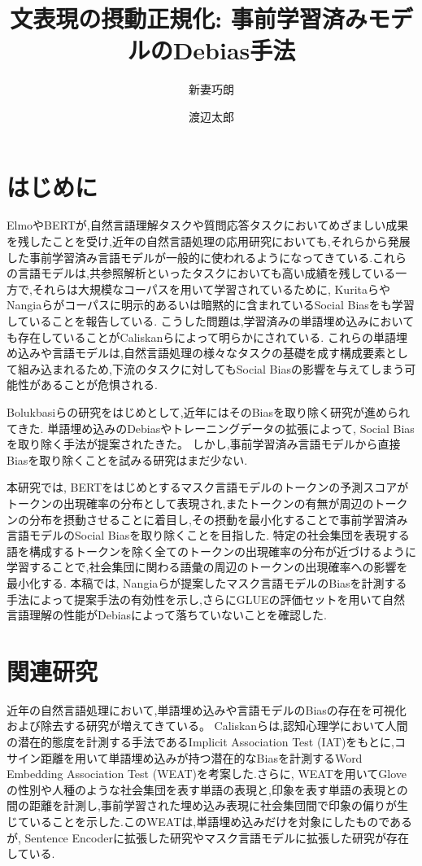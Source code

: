 \documentclass[
  platex, dvipdfmx %
]{nlp2021}
\title{文表現の摂動正規化: 事前学習済みモデルのDebias手法}
\author{新妻巧朗}
\author{渡辺太郎}
\affil{奈良先端科学技術大学院大学 先端科学技術研究科 \\ \texttt{\{niitsuma.takuro.nm3, taro\}@is.naist.jp}}
\begin{document}
\maketitle

\section{はじめに}
Elmo\cite{Peters:2018}やBERT\cite{devlin2018bert}が,自然言語理解タスクや質問応答タスクにおいてめざましい成果を残したことを受け,近年の自然言語処理の応用研究においても,それらから発展した事前学習済み言語モデルが一般的に使われるようになってきている.これらの言語モデルは,共参照解析\cite{joshi2019spanbert}といったタスクにおいても高い成績を残している一方で,それらは大規模なコーパスを用いて学習されているために, Kuritaら\cite{kurita2019measuring}やNangiaら\cite{nangia2020crows}がコーパスに明示的あるいは暗黙的に含まれているSocial Biasをも学習していることを報告している.
こうした問題は,学習済みの単語埋め込みにおいても存在していることがCaliskanら\cite{caliskan2017}によって明らかにされている.
これらの単語埋め込みや言語モデルは,自然言語処理の様々なタスクの基礎を成す構成要素として組み込まれるため,下流のタスクに対してもSocial Biasの影響を与えてしまう可能性があることが危惧される.

Bolukbasiら\cite{bolukbasi2016man}の研究をはじめとして,近年にはそのBiasを取り除く研究が進められてきた.
単語埋め込みのDebiasやトレーニングデータの拡張によって, Social Biasを取り除く手法\cite{kaneko-bollegala-2019-gender, zhao-etal-2018-gender, lucas2018}が提案されたきた。
しかし,事前学習済み言語モデルから直接Biasを取り除くことを試みる研究はまだ少ない.

本研究では, BERTをはじめとするマスク言語モデルのトークンの予測スコアがトークンの出現確率の分布として表現され,またトークンの有無が周辺のトークンの分布を摂動させることに着目し,その摂動を最小化することで事前学習済み言語モデルのSocial Biasを取り除くことを目指した.
特定の社会集団を表現する語を構成するトークンを除く全てのトークンの出現確率の分布が近づけるように学習することで,社会集団に関わる語彙の周辺のトークンの出現確率への影響を最小化する.
本稿では, Nangiaら\cite{nangia2020crows}が提案したマスク言語モデルのBiasを計測する手法によって提案手法の有効性を示し,さらにGLUEの評価セットを用いて自然言語理解の性能がDebiasによって落ちていないことを確認した.

\section{関連研究}
近年の自然言語処理において,単語埋め込みや言語モデルのBiasの存在を可視化および除去する研究が増えてきている。
Caliskanら\cite{caliskan2017}は,認知心理学において人間の潜在的態度を計測する手法であるImplicit Association Test (IAT)\cite{Greenwald98measuringindividual}をもとに,コサイン距離を用いて単語埋め込みが持つ潜在的なBiasを計測するWord Embedding Association Test (WEAT)を考案した.さらに, WEATを用いてGlove\cite{pennington2014glove}の性別や人種のような社会集団を表す単語の表現と,印象を表す単語の表現との間の距離を計測し,事前学習された埋め込み表現に社会集団間で印象の偏りが生じていることを示した.このWEATは,単語埋め込みだけを対象にしたものであるが, Sentence Encoderに拡張した研究\cite{may-etal-2019-measuring}やマスク言語モデルに拡張した研究\cite{kurita2019measuring}が存在している.
\end{document}
